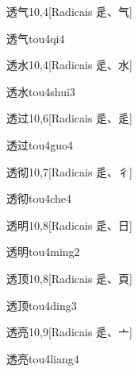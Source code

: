 \begin{entry}{透气}{10,4}[Radicais ⾡、⽓]
  \begin{phonetics}{透气}{tou4qi4}
  \end{phonetics}
\end{entry}

\begin{entry}{透水}{10,4}[Radicais ⾡、⽔]
  \begin{phonetics}{透水}{tou4shui3}
  \end{phonetics}
\end{entry}

\begin{entry}{透过}{10,6}[Radicais ⾡、⾡]
  \begin{phonetics}{透过}{tou4guo4}
  \end{phonetics}
\end{entry}

\begin{entry}{透彻}{10,7}[Radicais ⾡、⼻]
  \begin{phonetics}{透彻}{tou4che4}
  \end{phonetics}
\end{entry}

\begin{entry}{透明}{10,8}[Radicais ⾡、⽇]
  \begin{phonetics}{透明}{tou4ming2}
  \end{phonetics}
\end{entry}

\begin{entry}{透顶}{10,8}[Radicais ⾡、⾴]
  \begin{phonetics}{透顶}{tou4ding3}
  \end{phonetics}
\end{entry}

\begin{entry}{透亮}{10,9}[Radicais ⾡、⼇]
  \begin{phonetics}{透亮}{tou4liang4}
  \end{phonetics}
\end{entry}

